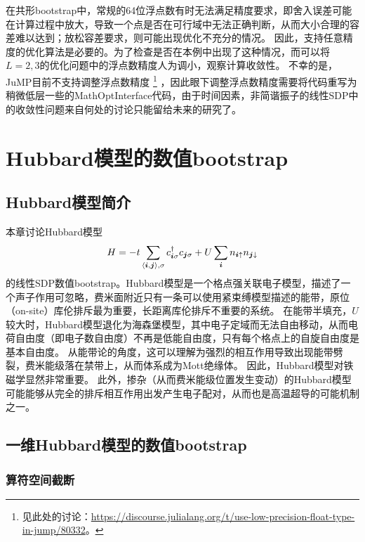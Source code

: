 \documentclass[oneside]{fduthesis}
\begin{document}
在共形bootstrap中，常规的64位浮点数有时无法满足精度要求，即舍入误差可能在计算过程中放大，导致一个点是否在可行域中无法正确判断，从而大小合理的容差难以达到；放松容差要求，则可能出现优化不充分的情况。
因此，支持任意精度的优化算法是必要的\cite{conformal-sdp}。为了检查是否在本例中出现了这种情况，而可以将$L=2, 3$的优化问题中的浮点数精度人为调小，观察计算收敛性。
不幸的是，JuMP目前不支持调整浮点数精度%
\footnote{见此处的讨论：\url{https://discourse.julialang.org/t/use-low-precision-float-type-in-jump/80332}。}%
，因此眼下调整浮点数精度需要将代码重写为稍微低层一些的MathOptInterface\cite{legat2021mathoptinterface}代码，由于时间因素，非简谐振子的线性SDP中的收敛性问题来自何处的讨论只能留给未来的研究了。

\chapter{Hubbard模型的数值bootstrap}\label{chap:hubbard}

\section{Hubbard模型简介}

本章讨论Hubbard模型
\begin{equation}
    H = - t \sum_{\langle \vb*{i}, \vb*{j} \rangle, \sigma} c^\dagger_{\vb*{i} \sigma} c_{\vb*{j} \sigma} + U \sum_{\vb*{i}} n_{\vb*{i} \uparrow} n_{\vb*{j} \downarrow}
\end{equation}
的线性SDP数值bootstrap。Hubbard模型是一个格点强关联电子模型，描述了一个声子作用可忽略，费米面附近只有一条可以使用紧束缚模型描述的能带，原位（on-site）库伦排斥最为重要，长距离库伦排斥不重要的系统。
在能带半填充，$U$较大时，Hubbard模型退化为海森堡模型，其中电子定域而无法自由移动，从而电荷自由度（即电子数自由度）不再是低能自由度，只有每个格点上的自旋自由度是基本自由度。
从能带论的角度，这可以理解为强烈的相互作用导致出现能带劈裂，费米能级落在禁带上，从而体系成为Mott绝缘体。
因此，Hubbard模型对铁磁学显然非常重要。
此外，掺杂（从而费米能级位置发生变动）的Hubbard模型可能能够从完全的排斥相互作用出发产生电子配对，从而也是高温超导的可能机制之一。\cite{fradkin2013field}



\section{一维Hubbard模型的数值bootstrap}

\subsection{算符空间截断}
\end{document}
